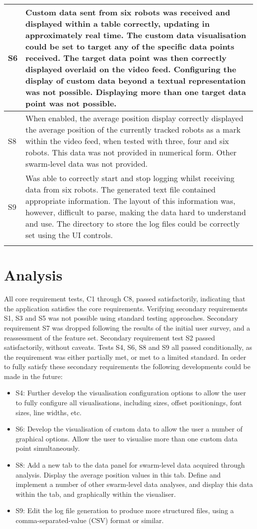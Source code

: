 \begin{longtable}{ l p{10cm} }
 S6 & Custom data sent from six robots was received and displayed within a table correctly, updating in approximately real time. The custom data visualisation could be set to target any of the specific data points received. The target data point was then correctly displayed overlaid on the video feed. Configuring the display of custom data beyond a textual representation was not possible. Displaying more than one target data point was not possible.\\\hline
 S8 & When enabled, the average position display correctly displayed the average position of the currently tracked robots as a mark within the video feed, when tested with three, four and six robots. This data was not provided in numerical form. Other swarm-level data was not provided.\\\hline
 S9 & Was able to correctly start and stop logging whilst receiving data from six robots. The generated text file contained appropriate information. The layout of this information was, however, difficult to parse, making the data hard to understand and use. The directory to store the log files could be correctly set using the UI controls.\\\hline
 \bottomrule\\
\end{longtable}

\section{Analysis}
All core requirement tests, C1 through C8, passed satisfactorily, indicating that the application satisfies the core requirements. Verifying secondary requirements S1, S3 and S5 was not possible using standard testing approaches. Secondary requirement S7 was dropped following the results of the initial user survey, and a reassessment of the feature set. Secondary requirement test S2 passed satisfactorily, without caveats. Tests S4, S6, S8 and S9 all passed conditionally, as the requirement was either partially met, or met to a limited standard. In order to fully satisfy these secondary requirements the following developments could be made in the future:

\begin{itemize}
 \item S4: Further develop the visualisation configuration options to allow the user to fully configure all visualisations, including sizes, offset positionings, font sizes, line widths, etc.
 \item S6: Develop the visualisation of custom data to allow the user a number of graphical options. Allow the user to visualise more than one custom data point simultaneously.
 \item S8: Add a new tab to the data panel for swarm-level data acquired through analysis. Display the average position values in this tab. Define and implement a number of other swarm-level data analyses, and display this data within the tab, and graphically within the visualiser.
 \item S9: Edit the log file generation to produce more structured files, using a comma-separated-value (CSV) format or similar.
\end{itemize}


